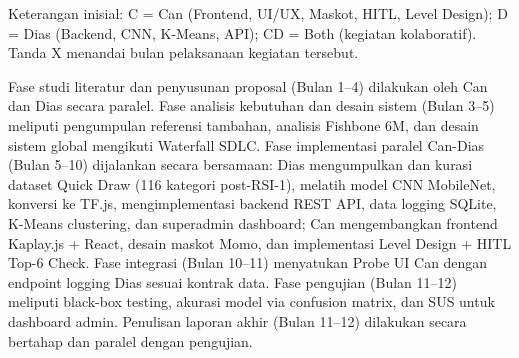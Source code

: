 \documentclass[12pt,a4paper,oneside,openany]{report}
\begin{document}
Keterangan inisial: C = Can (Frontend, UI/UX, Maskot, HITL, Level Design); D = Dias (Backend, CNN, K-Means, API); CD = Both (kegiatan kolaboratif). Tanda X menandai bulan pelaksanaan kegiatan tersebut.

Fase studi literatur dan penyusunan proposal (Bulan 1--4) dilakukan oleh Can dan Dias secara paralel. Fase analisis kebutuhan dan desain sistem (Bulan 3--5) meliputi pengumpulan referensi tambahan, analisis Fishbone 6M, dan desain sistem global mengikuti Waterfall SDLC. Fase implementasi paralel Can-Dias (Bulan 5--10) dijalankan secara bersamaan: Dias mengumpulkan dan kurasi dataset Quick Draw (116 kategori post-RSI-1), melatih model CNN MobileNet, konversi ke TF.js, mengimplementasi backend REST API, data logging SQLite, K-Means clustering, dan superadmin dashboard; Can mengembangkan frontend Kaplay.js + React, desain maskot Momo, dan implementasi Level Design + HITL Top-6 Check. Fase integrasi (Bulan 10--11) menyatukan Probe UI Can dengan endpoint logging Dias sesuai kontrak data. Fase pengujian (Bulan 11--12) meliputi black-box testing, akurasi model via confusion matrix, dan SUS untuk dashboard admin. Penulisan laporan akhir (Bulan 11--12) dilakukan secara bertahap dan paralel dengan pengujian.
\end{document}
